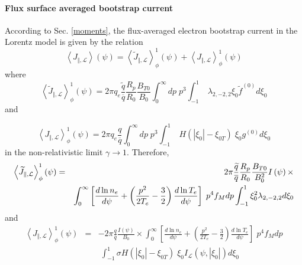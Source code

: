 \paragraph{Flux surface averaged bootstrap current\label{BootLor}}

According to Sec. \ref{moments}, the flux-averaged electron bootstrap
current in the Lorentz model is given by the relation
\begin{equation}
\left\langle J_{\Vert ,\mathcal{L}}\right\rangle \left( \psi \right)
=\left\langle \widetilde{J}_{\Vert ,\mathcal{L}}\right\rangle _{\phi
}^{1}\left( \psi \right) +\left\langle J_{\Vert ,\mathcal{L}}\right\rangle
_{\phi }^{1}\left( \psi \right)
\end{equation}
where
\begin{equation}
\left\langle \widetilde{J}_{\Vert ,\mathcal{L}}\right\rangle _{\phi
}^{1}\left( \psi \right) =2\pi q_{e}\frac{\widetilde{q}}{\overline{q}}\frac{
R_{p}}{R_{0}}\frac{B_{T0}}{B_{0}}\int_{0}^{\infty }dp\;p^{3}\int_{-1}^{1}\;%
\lambda _{2,-2,2}\xi _{0}\widetilde{f}^{(0)}d\xi _{0}
\end{equation}
and

\begin{equation}
\left\langle J_{\Vert ,\mathcal{L}}\right\rangle _{\phi }^{1}\left( \psi
\right) =2\pi q_{e}\frac{q}{\overline{q}}\int_{0}^{\infty %
}dp\;p^{3}\int_{-1}^{1}\;H\left( \left| \xi _{0}\right| -\xi _{0T}\right)
\;\xi _{0}g^{(0)}d\xi _{0}
\end{equation}
in the non-relativistic limit $\gamma \rightarrow 1.$ Therefore,
\begin{eqnarray}
\left\langle \widetilde{J}_{\Vert ,\mathcal{L}}\right\rangle _{\phi
}^{1}\left( \psi \right)  &=&2\pi \frac{\widetilde{q}}{\overline{q}}\frac{
R_{p}}{R_{0}}\frac{B_{T0}}{B_{0}^{2}}I\left( \psi \right) \times   \nonumber
\\
&&\int_{0}^{\infty }\left[ \frac{d\ln n_{e}}{d\psi }+\left( \frac{p^{2}}{%
2T_{e}}-\frac{3}{2}\right) \frac{d\ln T_{e}}{d\psi }\right]
\;p^{4}f_{M}dp\int_{-1}^{1}\xi _{0}^{2}\lambda _{2,-2,2}d\xi
_{0}\nonumber
\\
\end{eqnarray}
and
\begin{eqnarray}
\left\langle J_{\Vert ,\mathcal{L}}\right\rangle _{\phi }^{1}\left( \psi
\right)  &=&-2\pi \frac{q}{\overline{q}}\frac{I\left( \psi \right) }{B_{0}}%
\times \int_{0}^{\infty }\left[ \frac{d\ln n_{e}}{d\psi }+\left( \frac{p^{2}%
}{2T_{e}}-\frac{3}{2}\right) \frac{d\ln T_{e}}{d\psi }\right] \;p^{4}f_{M}dp
\nonumber \\
&&\;\int_{-1}^{1}\sigma H\left( \left| \xi _{0}\right| -\xi _{0T}\right)
\;\xi _{0}I_{\mathcal{L}}\left( \psi ,\left| \xi _{0}\right| \right) d\xi
_{0}
\end{eqnarray}

